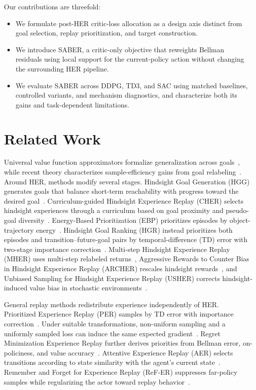 \documentclass[letterpaper]{article}
\begin{document}
Our contributions are threefold:
\begin{itemize}
    \item We formulate post-HER critic-loss allocation as a design axis distinct from goal selection, replay prioritization, and target construction.

    \item We introduce SABER, a critic-only objective that reweights Bellman residuals using local support for the current-policy action without changing the surrounding HER pipeline.

    \item We evaluate SABER across DDPG, TD3, and SAC using matched baselines, controlled variants, and mechanism diagnostics, and characterize both its gains and task-dependent limitations.
\end{itemize}

\section{Related Work}

Universal value function approximators formalize generalization across goals~\citep{schaul2015uvfa}, while recent theory characterizes sample-efficiency gains from goal relabeling~\citep{zheng2024goalrelabeling}. Around HER, methods modify several stages. Hindsight Goal Generation (HGG) generates goals that balance short-term reachability with progress toward the desired goal~\citep{ren2019hgg}. Curriculum-guided Hindsight Experience Replay (CHER) selects hindsight experiences through a curriculum based on goal proximity and pseudo-goal diversity~\citep{fang2019cher}. Energy-Based Prioritization (EBP) prioritizes episodes by object-trajectory energy~\citep{zhao2018ebp}. Hindsight Goal Ranking (HGR) instead prioritizes both episodes and transition--future-goal pairs by temporal-difference (TD) error with two-stage importance correction~\citep{luu2021hgr}. Multi-step Hindsight Experience Replay (MHER) uses multi-step relabeled returns~\citep{yang2023mher}, Aggressive Rewards to Counter Bias in Hindsight Experience Replay (ARCHER) rescales hindsight rewards~\citep{lanka2018archer}, and Unbiased Sampling for Hindsight Experience Replay (USHER) corrects hindsight-induced value bias in stochastic environments~\citep{schramm2023usher}.

General replay methods redistribute experience independently of HER. Prioritized Experience Replay (PER) samples by TD error with importance correction~\citep{schaul2016per}. Under suitable transformations, non-uniform sampling and a uniformly sampled loss can induce the same expected gradient~\citep{fujimoto2020equivalence}. Regret Minimization Experience Replay further derives priorities from Bellman error, on-policiness, and value accuracy~\citep{liu2021regret}. Attentive Experience Replay (AER) selects transitions according to state similarity with the agent's current state~\citep{sun2020aer}. Remember and Forget for Experience Replay (ReF-ER) suppresses far-policy samples while regularizing the actor toward replay behavior~\citep{novati2019refer}.
\end{document}
